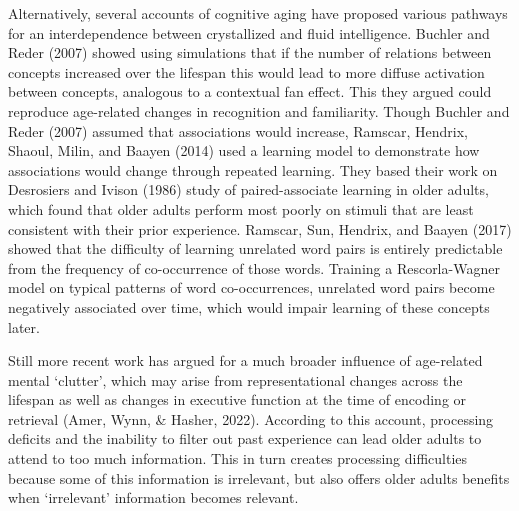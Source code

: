 \documentclass[
  man]{apa6}
\begin{document}
Alternatively, several accounts of cognitive aging have proposed various pathways for an interdependence between crystallized and fluid intelligence. Buchler and Reder (2007) showed using simulations that if the number of relations between concepts increased over the lifespan this would lead to more diffuse activation between concepts, analogous to a contextual fan effect. This they argued could reproduce age-related changes in recognition and familiarity. Though Buchler and Reder (2007) assumed that associations would increase, Ramscar, Hendrix, Shaoul, Milin, and Baayen (2014) used a learning model to demonstrate how associations would change through repeated learning. They based their work on Desrosiers and Ivison (1986) study of paired-associate learning in older adults, which found that older adults perform most poorly on stimuli that are least consistent with their prior experience. Ramscar, Sun, Hendrix, and Baayen (2017) showed that the difficulty of learning unrelated word pairs is entirely predictable from the frequency of co-occurrence of those words. Training a Rescorla-Wagner model on typical patterns of word co-occurrences, unrelated word pairs become negatively associated over time, which would impair learning of these concepts later.

Still more recent work has argued for a much broader influence of age-related mental `clutter', which may arise from representational changes across the lifespan as well as changes in executive function at the time of encoding or retrieval (Amer, Wynn, \& Hasher, 2022). According to this account, processing deficits and the inability to filter out past experience can lead older adults to attend to too much information. This in turn creates processing difficulties because some of this information is irrelevant, but also offers older adults benefits when `irrelevant' information becomes relevant.
\end{document}

